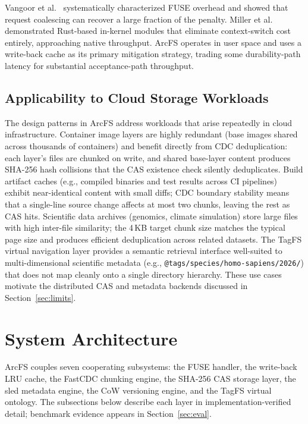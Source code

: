 \documentclass[journal]{IEEEtran}
\begin{document}
Vangoor et al.~\cite{vangoor2017fuse} systematically characterized FUSE
overhead and showed that request coalescing can recover a large fraction of
the penalty. Miller et al.~\cite{miller2021bento} demonstrated Rust-based
in-kernel modules that eliminate context-switch cost entirely, approaching
native throughput. ArcFS operates in user space and uses a write-back
cache as its primary mitigation strategy, trading some durability-path
latency for substantial acceptance-path throughput.

\subsection{Applicability to Cloud Storage Workloads}

The design patterns in ArcFS address workloads that arise repeatedly in
cloud infrastructure.  Container image layers are highly redundant
(base images shared across thousands of containers) and benefit directly
from CDC deduplication: each layer's files are chunked on write, and
shared base-layer content produces SHA-256 hash collisions that the CAS
existence check silently deduplicates.  Build artifact caches (e.g.,
compiled binaries and test results across CI pipelines) exhibit near-identical
content with small diffs; CDC boundary stability means that a single-line
source change affects at most two chunks, leaving the rest as CAS
hits.  Scientific data archives (genomics, climate simulation) store
large files with high inter-file similarity; the 4\,KB target chunk size
matches the typical page size and produces efficient deduplication across
related datasets.  The TagFS virtual navigation layer provides a semantic
retrieval interface well-suited to multi-dimensional scientific metadata
(e.g., \texttt{@tags/species/homo-sapiens/2026/}) that does not map
cleanly onto a single directory hierarchy.  These use cases motivate the
distributed CAS and metadata backends discussed in Section~\ref{sec:limits}.

\section{System Architecture}
\label{sec:arch}

ArcFS couples seven cooperating subsystems: the FUSE handler, the
write-back LRU cache, the FastCDC chunking engine, the SHA-256 CAS
storage layer, the sled metadata engine, the CoW versioning engine,
and the TagFS virtual ontology. The subsections below describe each
layer in implementation-verified detail; benchmark evidence appears
in Section~\ref{sec:eval}.
\end{document}
